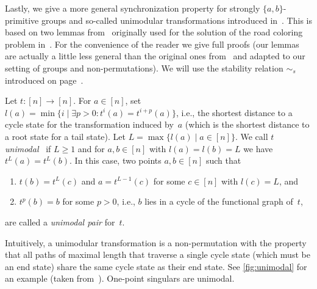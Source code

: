 Lastly, we give a more general synchronization property for strongly $\{a,b\}$-primitive groups
and so-called unimodular transformations introduced in~\cite{Volkov24}.
This is based on two lemmas from~\cite[Lem.~4.3 \& 4.4]{KariVolkov2021} 
originally used for the solution of the road coloring problem in~\cite{KariVolkov2021}.
For the convenience of the reader we give full proofs (our lemmas are actually a little less general
than the original ones from~\cite{KariVolkov2021} and adapted to our setting of groups and non-permutations).
We will use the stability relation $\sim_s$ introduced on page~\pageref{def:stability}.

Let $t \colon [n] \to [n]$. For $a \in [n]$, set $l(a) = \min\{ i \mid \exists p > 0 \colon t^i(a) = t^{i + p}(a) \}$, i.e., the
shortest distance to a cycle state for the transformation induced by~$a$
(which is the shortest distance to a root state for a tail state).
Let $L = \max\{ l(a) \mid a \in [n] \}$.
We call $t$ \emph{unimodal}~\cite{Volkov24} if $L \ge 1$ and for $a,b \in [n]$ with $l(a) = l(b) = L$
we have $t^L(a) = t^L(b)$. In this case, two points $a,b \in [n]$
such that
\begin{enumerate}
	\item $t(b) = t^L(c)$ and $a = t^{L -1}(c)$ for some $c \in [n]$ with $l(c) = L$, and
	
	\item $t^p(b) = b$ for some $p > 0$, i.e., $b$ lies in a cycle of the functional graph of~$t$,
\end{enumerate} 
are called a \emph{unimodal pair} for~$t$.

Intuitively, a unimodular transformation is a non-permutation
with the property that all paths of maximal length that traverse a single cycle state (which must be an end state)
share the same cycle state as their end state. See \cref{fig:unimodal} for an example (taken from~\cite{Volkov24}).
One-point singulars are unimodal.

